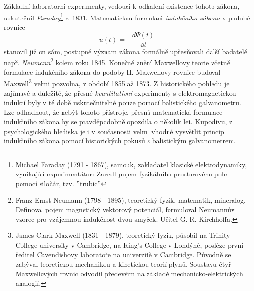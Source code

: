     Základní laboratorní experimenty, vedoucí k odhalení existence tohoto zákona, uskutečnil 
    \emph{Faraday}\footnote{Michael Faraday (1791 - 1867), samouk, zakladatel klasické 
    elektrodynamiky, vynikající experimentátor: Zavedl pojem fyzikálního prostorového pole pomocí 
    siločár, tzv. ''trubic''} r. 1831. Matematickou formulaci \emph{indukčního zákona} v podobě 
    rovnice
    \begin{equation}\label{ES:eq_zakl_elm25}
      u(t) = - \frac{d\Psi(t)}{\dd{t}}
    \end{equation} 
    stanovil již on sám, postupně význam zákona formálně upřesňovali další badatelé např.
    \emph{Neumann}\footnote{Franz Ernst Neumann (1798 - 1895), teoretický fyzik, matematik,
    mineralog. Definoval pojem magnetický vektorový potenciál, formuloval Neumannův vzorec pro
    vzájemnou indukčnost dvou smyček. Učitel G. R. Kirchhoffa.} kolem roku 1845. Konečné znění
    Maxwellovy teorie včetně formulace indukčního zákona do podoby II. Maxwellovy rovnice budoval
    Maxwell\footnote{James Clark Maxwell (1831 - 1879), teoretický fyzik, působil na Trinity College
    university v Cambridge, na King's College v Londýně, posléze první ředitel Cavendishovy
    laboratoře na univerzitě v Cambridge. Původně se zabýval teoretickou mechanikou a kinetickou
    teorií plynů. Soustavu čtyř Maxwellových rovnic odvodil především na základě
    mechanicko-elektrických analogií.} velmi pozvolna, v období 1855 až 1873. Z historického pohledu
    je zajímavé a důležité, že přesné \emph{kvantitativní} experimenty s elektromagnetickou indukcí
    byly v té době uskutečnitelné pouze pomocí
    \href{http://en.wikipedia.org/wiki/Galvanometer}{balistického galvanometru}. Lze odhadnout, že
    nebýt tohoto přístroje, přesná matematická formulace indukčního zákona by se pravděpodobně
    opozdila o několik let. Kupodivu, z psychologického hlediska je i v současnosti velmi vhodné
    vysvětlit princip indukčního zákona pomocí historických pokusů s balistickým galvanometrem.
    
